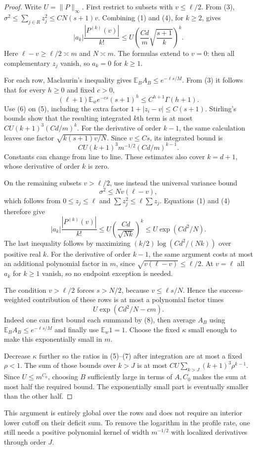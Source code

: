 \documentclass[11pt]{article}
\newcommand{\E}{\mathbb E}
\begin{document}
\begin{proof}
Write $U=\|P\|_\infty$. First restrict to subsets with $v\le\ell/2$.
From (3),
$\sigma^2\le\sum_{j\in R}z_j^2\le CN(s+1)v$.
Combining (1) and (4), for $k\ge2$, gives
\[
 |a_k|\frac{|P^{(k)}(v)|}{k!}
 \le U\left(\frac{Cd}{m}\sqrt{\frac{s+1}{k}}\right)^k.
                                                               \tag{5}
\]
Here $\ell-v\ge\ell/2\asymp m$ and $N\asymp m$.
The formulas extend to $v=0$: then all complementary $z_j$ vanish,
so $a_k=0$ for $k\ge1$.

For each row, Maclaurin's inequality gives
$\E_BA_B\le e^{-\ell s/M}$. From (3) it follows that for every
$h\ge0$ and fixed $c>0$,
\[
 (\ell+1)\E_w e^{-cs}(s+1)^h
                         \le C^{h+1}\Gamma(h+1).          \tag{6}
\]
Use (6) on (5), including the extra factor
$1+|z_i-v|\le C(s+1)$. Stirling's bounds show that the resulting
integrated $k$th term is at most
$CU(k+1)^3(Cd/m)^k$.
For the derivative of order $k-1$, the same calculation leaves one
factor $\sqrt{k(s+1)v/N}$. Since $v\le Cs$, its integrated bound is
\[
 CU(k+1)^3m^{-1/2}(Cd/m)^{k-1}.                          \tag{7}
\]
Constants can change from line to line. These estimates also cover
$k=d+1$, whose derivative of order $k$ is zero.

On the remaining subsets $v>\ell/2$, use instead the universal
variance bound
\[
 \sigma^2\le N v(\ell-v),
\]
which follows from $0\le z_j\le\ell$ and
$\sum z_j^2\le\ell\sum z_j$.
Equations (1) and (4) therefore give
\[
 |a_k|\frac{|P^{(k)}(v)|}{k!}
 \le U\left(\frac{Cd}{\sqrt{Nk}}\right)^k
 \le U\exp(Cd^2/N).                                   \tag{8}
\]
The last inequality follows by maximizing
$(k/2)\log(Cd^2/(Nk))$ over positive real $k$.
For the derivative of order $k-1$, the same argument costs at most
an additional polynomial factor in $m$, since
$\sqrt{v(\ell-v)}\le\ell/2$. At $v=\ell$ all $a_k$ for $k\ge1$
vanish, so no endpoint exception is needed.

The condition $v>\ell/2$ forces $s>N/2$, because
$v\le\ell s/N$. Hence the success-weighted contribution of these
rows is at most a polynomial factor times
\[
 U\exp(Cd^2/N-cm).
\]
Indeed one can first bound each summand by (8), then average $A_B$
using $\E_BA_B\le e^{-\ell s/M}$ and finally use $\E_w1=1$.
Choose the fixed $\kappa$ small enough to make this exponentially
small in $m$.

Decrease $\kappa$ further so the ratios in (5)--(7) after integration
are at most a fixed $\rho<1$.
The sum of those bounds over $k>J$ is at most
$CU\sum_{k>J}(k+1)^3\rho^{k-1}$.
Since $U\le m^{C_0}$, choosing $B$ sufficiently large in terms of
$A,C_0$ makes the sum at most half the required bound. The
exponentially small part is eventually smaller than the other half.
\end{proof}

This argument is entirely global over the rows and does not require
an interior lower cutoff on their deficit sum. To remove the logarithm
in the profile rate, one still needs a positive polynomial kernel of
width $m^{-1/2}$ with localized derivatives through order $J$.
\end{document}
